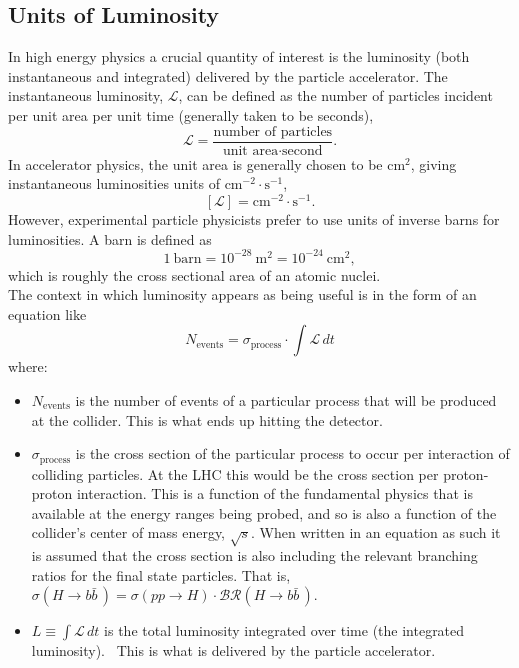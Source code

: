 \subsection{Units of Luminosity}\label{subsection:luminosity_units}
In high energy physics a crucial quantity of interest is the luminosity (both instantaneous and integrated) delivered by the particle accelerator.
The instantaneous luminosity, $\mathscr{L}$, can be defined as the number of particles incident per unit area per unit time (generally taken to be seconds),
\begin{equation}
 \mathscr{L} = \frac{\text{number of particles}}{\text{unit area} \cdot \text{second}}.
 \label{eq:instantaneous_luminosity}
\end{equation}
In accelerator physics, the unit area is generally chosen to be $\textrm{cm}^2$, giving instantaneous luminosities units of $\textrm{cm}^{-2} \cdot \textrm{s}^{-1}$,
\[
 \left[\mathscr{L}\right] = \textrm{cm}^{-2} \cdot \textrm{s}^{-1}.
\]
However, experimental particle physicists prefer to use units of inverse barns for luminosities. A barn is defined as
\begin{equation}
 1~\textrm{barn} = 10^{-28}~\textrm{m}^2 = 10^{-24}~\textrm{cm}^2,
 \label{eq:barn_to_area}
\end{equation}
which is roughly the cross sectional area of an atomic nuclei.~\cite{web:history_physics_purdue,history:etymology_barn}\\

The context in which luminosity appears as being useful is in the form of an equation like
\[
 N_{\textrm{events}} = \sigma_{\textrm{process}} \cdot \int \mathscr{L}\,dt
\]
where:
\begin{itemize}
 \item $N_{\text{events}}$ is the number of events of a particular process that will be produced at the collider.
       This is what ends up hitting the detector.
 \item $\sigma_{\textrm{process}}$ is the cross section of the particular process to occur per interaction of colliding particles.
       At the LHC this would be the cross section per proton-proton interaction.
       This is a function of the fundamental physics that is available at the energy ranges being probed, and so is also a function of the collider's center of mass energy, $\sqrt{s}$.
       When written in an equation as such it is assumed that the cross section is also including the relevant branching ratios for the final state particles.
       That is, $\sigma\left(H \to b\bar{b}\,\right) = \sigma\left(pp \to H\right) \cdot \mathcal{BR}\left(H \to b\bar{b}\,\right)$.
 \item $L \equiv \int \mathscr{L}\,dt$ is the total luminosity integrated over time (the integrated luminosity).~\cite{Herr:941318}
       This is what is delivered by the particle accelerator.
\end{itemize}

